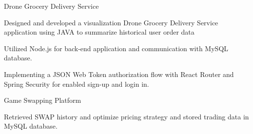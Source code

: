 


\begin{cventries}


\compactcventry
{Drone Grocery Delivery Service}
{} %
{
\begin{cvitems}
	\item{Designed and developed a visualization Drone Grocery Delivery Service application using JAVA to summarize historical user order data}
	\item{Utilized Node.js for back-end application and communication with MySQL database.}
	\item{Implementing a JSON Web Token authorization flow with React Router and Spring Security for enabled sign-up and login in.}		
\end{cvitems}
}



\compactcventry
{Game Swapping Platform}
{} %
{
\begin{cvitems}
	\item{Retrieved SWAP history and optimize pricing strategy and stored trading data in MySQL database.}	
\end{cvitems}
}



\end{cventries}